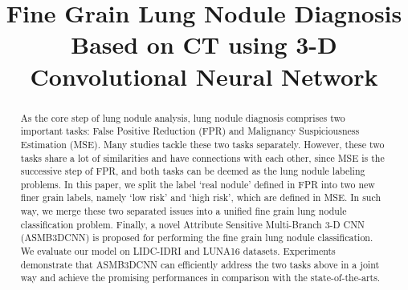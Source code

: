 \documentclass[runningheads]{llncs}
\begin{document}
%
\title{Fine Grain Lung Nodule Diagnosis Based on CT using 3-D Convolutional Neural Network}
%
%
\author{
}
%
\authorrunning{}
%
\institute{
}
%
\maketitle              %
%
\begin{abstract}
As the core step of lung nodule analysis, lung nodule diagnosis comprises two important tasks: False Positive Reduction (FPR) and Malignancy Suspiciousness Estimation (MSE). Many studies tackle these two tasks separately. However, these two tasks share a lot of similarities and have connections with each other, since MSE is the successive step of FPR, and both tasks can be deemed as the lung nodule labeling problems. In this paper, we split the label `real nodule' defined in FPR into two new finer grain labels, namely `low risk' and `high risk', which are defined in MSE. In such way, we merge these two separated issues into a unified fine grain lung nodule classification problem. Finally, a novel Attribute Sensitive Multi-Branch 3-D CNN (ASMB3DCNN) is proposed for performing the fine grain lung nodule classification. We evaluate our model on LIDC-IDRI and LUNA16 datasets. Experiments demonstrate that ASMB3DCNN can efficiently address the two tasks above in a joint way and achieve the promising performances in comparison with the state-of-the-arts.


\end{abstract}
\end{document}

